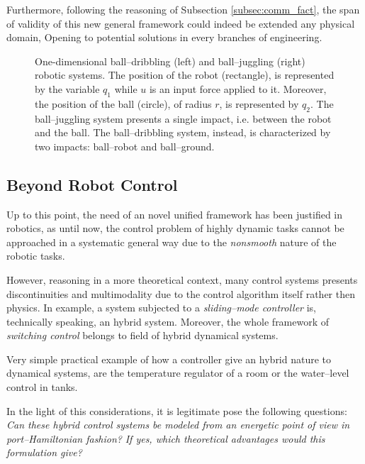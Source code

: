 Furthermore, following the reasoning of Subsection \ref{subsec:comm_fact}, the span of validity of this new general framework could indeed be extended any physical domain, Opening to potential solutions in every branches of engineering.
%
\begin{figure}[!t]
	\centering
	
	
	\caption{One-dimensional ball--dribbling (left) and ball--juggling (right) robotic systems. The position of the robot (rectangle), is represented by the variable $q_1$ while $u$ is an input force applied to it. Moreover, the position of the ball (circle), of radius $r$, is represented by $q_2$. The ball--juggling system presents a single impact, i.e. between the robot and the ball. The ball--dribbling system, instead, is characterized by two impacts: ball--robot and ball--ground.}
	\label{fig:1D}
\end{figure}
%
\subsection{Beyond Robot Control}
Up to this point, the need of an novel unified framework has been justified in robotics, as until now, the control problem of highly dynamic tasks cannot be approached in a systematic general way due to the \textit{nonsmooth} nature of the robotic tasks.
%
\newline

%
However, reasoning in a more theoretical context, many control systems presents discontinuities and multimodality due to the control algorithm itself rather then physics. 
In example, a system subjected to a \textit{sliding--mode controller} \cite{pisano2011sliding} is, technically speaking, an hybrid system. Moreover, the whole framework of \textit{switching control} belongs to field of hybrid dynamical systems.
%
\newline

%
Very simple practical example of how a controller give an hybrid nature to dynamical systems, are the temperature regulator of a room or the water--level control in tanks.
%
\newline

%
In the light of this considerations, it is legitimate pose the following questions: \newline
\textit{Can these hybrid control systems be modeled from an energetic point of view in port--Hamiltonian fashion?}\newline
\textit{If yes, which theoretical advantages would this formulation give?}

